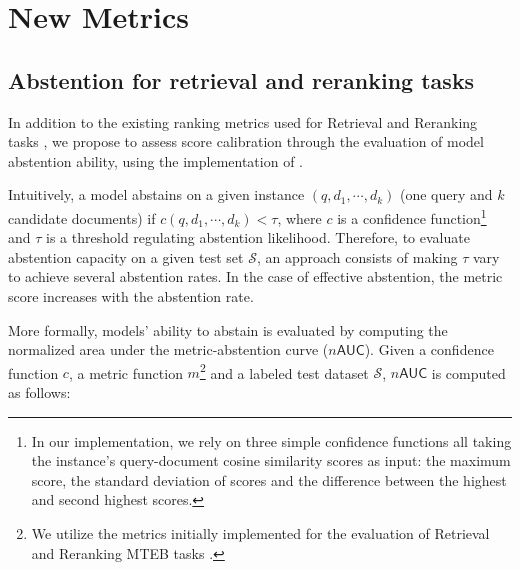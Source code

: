 \section{New Metrics}
\label{sec:new_metrics}

\subsection{Abstention for retrieval and reranking tasks}

In addition to the existing ranking metrics used for Retrieval and Reranking tasks \citep{muennighoff2023mteb}, we propose to assess score calibration through the evaluation of model abstention ability, using the implementation of \citet{gisserot2024towards}.

Intuitively, a model abstains on a given instance $\left( q, d_1, \cdots, d_k \right)$ (one query and $k$ candidate documents) if $c \left( q, d_1, \cdots, d_k \right) < \tau$, where $c$ is a confidence function\footnote{In our implementation, we rely on three simple confidence functions all taking the instance's query-document cosine similarity scores as input: the maximum score, the standard deviation of scores and the difference between the highest and second highest scores.} and $\tau$ is a threshold regulating abstention likelihood. Therefore, to evaluate abstention capacity on a given test set $\mathcal{S}$, an approach consists of making $\tau$ vary to achieve several abstention rates. In the case of effective abstention, the metric score increases with the abstention rate.

More formally, models' ability to abstain is evaluated by computing the normalized area under the metric-abstention curve ($n\textsf{AUC}$). Given a confidence function $c$, a metric function $m$\footnote{We utilize the metrics initially implemented for the evaluation of Retrieval and Reranking MTEB tasks \citep{muennighoff2023mteb}.} and a labeled test dataset $\mathcal{S}$, $n\textsf{AUC}$ is computed as follows:

